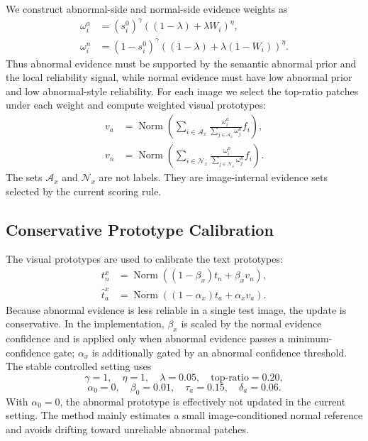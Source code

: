 We construct abnormal-side and normal-side evidence weights as
\begin{align}
  \omega_i^a &=
  (s_i^0)^\gamma\left((1-\lambda)+\lambda W_i\right)^\eta, \\
  \omega_i^n &=
  (1-s_i^0)^\gamma\left((1-\lambda)+\lambda(1-W_i)\right)^\eta .
  \label{eq:evidence-weights}
\end{align}
Thus abnormal evidence must be supported by the semantic abnormal prior and the
local reliability signal, while normal evidence must have low abnormal prior
and low abnormal-style reliability. For each image we select the top-ratio
patches under each weight and compute weighted visual prototypes:
\begin{align}
  v_a &= \operatorname{Norm}\left(
  \sum_{i\in\mathcal{A}_x}
  \frac{\omega_i^a}{\sum_{j\in\mathcal{A}_x}\omega_j^a} f_i\right), \\
  v_n &= \operatorname{Norm}\left(
  \sum_{i\in\mathcal{N}_x}
  \frac{\omega_i^n}{\sum_{j\in\mathcal{N}_x}\omega_j^n} f_i\right).
  \label{eq:visual-prototypes}
\end{align}
The sets $\mathcal{A}_x$ and $\mathcal{N}_x$ are not labels. They are
image-internal evidence sets selected by the current scoring rule.

\subsection{Conservative Prototype Calibration}

The visual prototypes are used to calibrate the text prototypes:
\begin{align}
  t_n^x &= \operatorname{Norm}\left((1-\beta_x)t_n+\beta_x v_n\right),\\
  \hat t_a^x &= \operatorname{Norm}\left((1-\alpha_x)t_a+\alpha_x v_a\right).
\end{align}
Because abnormal evidence is less reliable in a single test image, the update
is conservative. In the implementation, $\beta_x$ is scaled by the normal
evidence confidence and is applied only when abnormal evidence passes a
minimum-confidence gate; $\alpha_x$ is additionally gated by an abnormal
confidence threshold. The stable controlled setting uses
\[
\gamma=1,\quad \eta=1,\quad \lambda=0.05,\quad
\text{top-ratio}=0.20,
\]
\[
\alpha_0=0,\quad \beta_0=0.01,\quad \tau_a=0.15,\quad
\delta_a=0.06 .
\]
With $\alpha_0=0$, the abnormal prototype is effectively not updated in the
current setting. The method mainly estimates a small image-conditioned normal
reference and avoids drifting toward unreliable abnormal patches.

